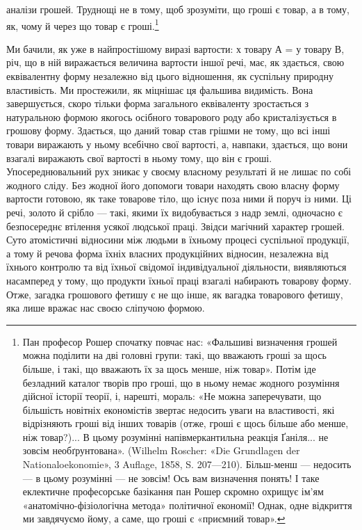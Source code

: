 \parcont{}  %
аналізи грошей. Труднощі не в тому, щоб зрозуміти, що гроші
є товар, а в тому, як, чому й через що товар є гроші.\footnote{
Пан професор Рошер спочатку повчає нас: «Фальшиві визначення
грошей можна поділити на дві головні групи: такі, що вважають гроші
за щось більше, і такі, що вважають їх за щось менше, ніж товар». Потім
іде безладний каталог творів про гроші, що в ньому немає жодного
розуміння дійсної історії теорії, і, нарешті, мораль: «Не можна заперечувати,
що більшість новітніх економістів звертає недосить уваги
на властивості, які відрізняють гроші від інших товарів (отже, гроші є
щось більше або менше, ніж товар?)... В цьому розумінні напівмеркантильна
реакція Ґаніля... не зовсім необґрунтована». (Wilhelm Roscher:
«Die Grundlagen der Nationaloekonomie», 3 Auflage, 1858, S. 207—210).
Більш-менш — недосить — в цьому розумінні — не зовсім! Ось вам визначення
понять! І таке еклектичне професорське базікання пан Рошер
скромно охрищує ім’ям «анатомічно-фізіологічна метода» політичної
економії! Однак, одне відкриття ми завдячуємо йому, а саме, що гроші
є «приємний товар».
}

Ми бачили, як уже в найпростішому виразі вартости: х товару
А = у товару В, річ, що в ній виражається величина вартости
іншої речі, має, як здається, свою еквівалентну форму незалежно
від цього відношення, як суспільну природну властивість. Ми
простежили, як міцнішає ця фальшива видимість. Вона завершується,
скоро тільки форма загального еквіваленту зростається
з натуральною формою якогось осібного товарового роду або
кристалізується в грошову форму. Здається, що даний товар став
грішми не тому, що всі інші товари виражають у ньому всебічно
свої вартості, а, навпаки, здається, що вони взагалі виражають
свої вартості в ньому тому, що він є гроші. Упосереднювальний
рух зникає у своєму власному результаті й не лишає по собі
жодного сліду. Без жодної його допомоги товари находять свою
власну форму вартости готовою, як таке товарове тіло, що існує
поза ними й поруч із ними. Ці речі, золото й срібло — такі,
якими їх видобувається з надр землі, одночасно є безпосереднє
втілення усякої людської праці. Звідси магічний характер грошей.
Суто атомістичні відносини між людьми в їхньому процесі
суспільної продукції, а тому й речова форма їхніх власних продукційних
відносин, незалежна від їхнього контролю та від
їхньої свідомої індивідуальної діяльности, виявляються насамперед
у тому, що продукти їхньої праці взагалі набирають товарову
форму. Отже, загадка грошового фетишу є не що інше, як
вагадка товарового фетишу, яка лише вражає нас своєю сліпучою
формою.

